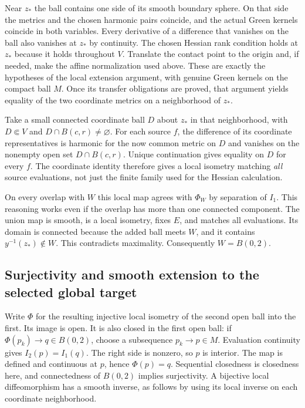 \documentclass[11pt]{article}
\theoremstyle{definition}
\theoremstyle{remark}
\numberwithin{equation}{section}
\begin{document}
Near $z_*$ the ball contains one side of its smooth boundary sphere.
On that side the metrics and the chosen harmonic pairs coincide,
and the actual Green kernels coincide in both variables.  Every
derivative of a difference that vanishes on the ball also vanishes
at $z_*$ by continuity.  The chosen Hessian rank condition holds
at $z_*$ because it holds throughout $V$.  Translate the contact
point to the origin and, if needed, make the affine normalization
used above.  These are exactly the hypotheses of the local extension
argument, with genuine Green kernels on the compact ball $M$.
Once its transfer obligations are proved, that argument yields equality
of the two coordinate metrics on a neighborhood of $z_*$.

Take a small connected coordinate ball $D$ about $z_*$ in that
neighborhood, with $D\Subset V$ and $D\cap B(c,r)\ne\varnothing$.
For each source $f$, the difference of its coordinate representatives
is harmonic for the now common metric on $D$ and vanishes on the
nonempty open set $D\cap B(c,r)$.  Unique continuation gives equality
on $D$ for every $f$.  The coordinate identity therefore gives a local
isometry matching \emph{all} source evaluations, not just the finite
family used for the Hessian calculation.

On every overlap with $W$ this local map agrees with $\Phi_W$ by
separation of $I_1$.  This reasoning works even if the overlap has
more than one connected component.  The union map is smooth, is a
local isometry, fixes $E$, and matches all evaluations.  Its domain
is connected because the added ball meets $W$, and it contains
$y^{-1}(z_*)\notin W$.  This contradicts maximality.  Consequently
$W=B(0,2)$.

\subsection{Surjectivity and smooth extension to the selected global target}
\label{bootstrap-expanded:finish}

Write $\Phi$ for the resulting injective local isometry of the second
open ball into the first.  Its image is open.  It is also closed in the
first open ball: if $\Phi(p_k)\to q\in B(0,2)$, choose a subsequence
$p_k\to p\in M$.  Evaluation continuity gives $I_2(p)=I_1(q)$.
The right side is nonzero, so $p$ is interior.  The map is defined
and continuous at $p$, hence $\Phi(p)=q$.  Sequential closedness is
closedness here, and connectedness of $B(0,2)$ implies surjectivity.
A bijective local diffeomorphism has a smooth inverse, as follows by
using its local inverse on each coordinate neighborhood.
\end{document}
